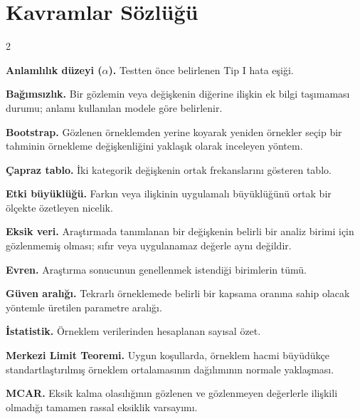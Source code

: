 \chapter*{Kavramlar Sözlüğü}

\begin{multicols}{2}
\raggedcolumns
\small

\textbf{Anlamlılık düzeyi ($\alpha$).} Testten önce belirlenen Tip I hata
eşiği.\par\smallskip

\textbf{Bağımsızlık.} Bir gözlemin veya değişkenin diğerine ilişkin ek bilgi
taşımaması durumu; anlamı kullanılan modele göre belirlenir.\par\smallskip

\ifimoders\else
\textbf{Bootstrap.} Gözlenen örneklemden yerine koyarak yeniden örnekler
seçip bir tahminin örnekleme değişkenliğini yaklaşık olarak inceleyen yöntem.\par\smallskip
\fi

\textbf{Çapraz tablo.} İki kategorik değişkenin ortak frekanslarını gösteren
tablo.\par\smallskip

\textbf{Etki büyüklüğü.} Farkın veya ilişkinin uygulamalı büyüklüğünü ortak
bir ölçekte özetleyen nicelik.\par\smallskip

\textbf{Eksik veri.} Araştırmada tanımlanan bir değişkenin belirli bir analiz
birimi için gözlenmemiş olması; sıfır veya uygulanamaz değerle aynı değildir.\par\smallskip

\textbf{Evren.} Araştırma sonucunun genellenmek istendiği birimlerin tümü.\par\smallskip

\textbf{Güven aralığı.} Tekrarlı örneklemede belirli bir kapsama oranına sahip
olacak yöntemle üretilen parametre aralığı.\par\smallskip

\textbf{İstatistik.} Örneklem verilerinden hesaplanan sayısal özet.\par\smallskip

\textbf{Merkezi Limit Teoremi.} Uygun koşullarda, örneklem hacmi büyüdükçe
standartlaştırılmış örneklem ortalamasının dağılımının normale yaklaşması.\par\smallskip

\textbf{MCAR.} Eksik kalma olasılığının gözlenen ve gözlenmeyen değerlerle
ilişkili olmadığı tamamen rassal eksiklik varsayımı.\par\smallskip


\end{multicols}
